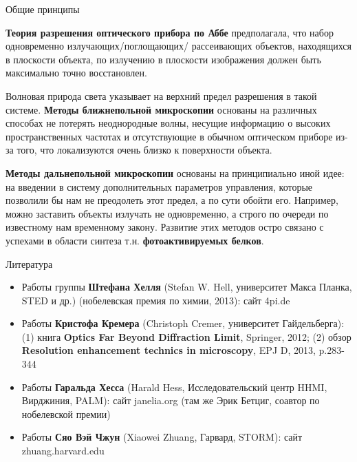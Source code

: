 \documentclass[9pt, compress, xcolor=table]{beamer}
\begin{document}
\begin{frame}{Общие принципы}

\textcolor{red!50!black}{\textbf{Теория разрешения оптического прибора по Аббе}} предполагала, что набор одновременно излучающих/поглощающих/ рассеивающих объектов, находящихся в плоскости объекта, по излучению в плоскости изображения должен быть максимально точно восстановлен. 

Волновая природа света указывает на верхний предел разрешения в такой системе. \textcolor{red!50!black}{\textbf{Методы ближнепольной микроскопии}} основаны на различных способах не потерять неоднородные волны, несущие информацию о высоких пространственных частотах и отсутствующие в обычном оптическом приборе из-за того, что локализуются очень близко к поверхности объекта.

\textcolor{red!50!black}{\textbf{Методы дальнепольной микроскопии}} основаны на принципиально иной идее: на введении в систему дополнительных параметров управления, которые позволили бы нам не преодолеть этот предел, а по сути обойти его. Например, можно заставить объекты излучать не одновременно, а строго по очереди по известному нам временному закону. Развитие этих методов остро связано с успехами в области синтеза т.н. \textcolor{red!50!black}{\textbf{фотоактивируемых белков}}.  


\end{frame}

\begin{frame}{Литература}

\begin{itemize}
\item Работы группы \textcolor{red!50!black}{\textbf{Штефана Хелля}} (Stefan W. Hell, университет Макса Планка, STED  и др.) (нобелевская премия по химии, 2013): сайт 4pi.de 
\item Работы \textcolor{red!50!black}{\textbf{Кристофа Кремера}} (Christoph Cremer, университет Гайдельберга): (1) книга \textbf{Optics Far Beyond Diffraction Limit}, Springer, 2012; (2)  обзор \textbf{Resolution enhancement technics in microscopy}, EPJ D, 2013, p.283-344
\item Работы \textcolor{red!50!black}{\textbf{Гаральда Хесса}} (Harald Hess, Исследовательский центр HHMI, Вирджиния, PALM): сайт janelia.org (там же Эрик Бетциг, соавтор по нобелевской премии)
\item Работы \textcolor{red!50!black}{\textbf{Сяо Вэй Чжун}} (Xiaowei Zhuang, Гарвард, STORM): сайт zhuang.harvard.edu
\end{itemize}

\end{frame}
\end{document}
